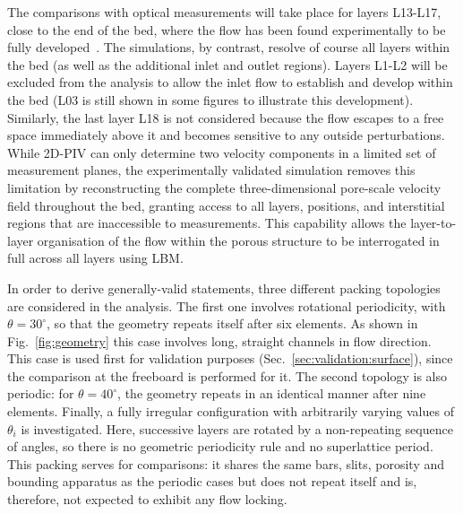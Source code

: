 The comparisons with optical measurements will take place for layers L13-L17, close to the end of the bed, where the flow has been found experimentally to be fully developed~\cite{velten2026}. The simulations, by contrast, resolve of course all layers within the bed (as well as the additional inlet and outlet regions). Layers L1-L2 will be excluded from the analysis to allow the inlet flow to establish and develop within the bed (L03 is still shown in some figures to illustrate this development). Similarly, the last layer L18 is not considered because the flow escapes to a free space immediately above it and becomes sensitive to any outside perturbations. While 2D-PIV can only determine two velocity components in a limited set of measurement planes, the experimentally validated simulation removes this limitation by reconstructing the complete three-dimensional pore-scale velocity field throughout the bed, granting access to all layers, positions, and interstitial regions that are inaccessible to measurements. This capability allows the layer-to-layer organisation of the flow within the porous structure to be interrogated in full across all layers using LBM.


In order to derive generally-valid statements, three different packing topologies are considered in the analysis. The first one involves rotational periodicity, with $\theta=30^\circ$, so that the geometry repeats itself after six elements. As shown in Fig.~\ref{fig:geometry} this case involves long, straight channels in flow direction. This case is used first for validation purposes (Sec.~\ref{sec:validation:surface}), since the comparison at the freeboard is performed for it.
The second topology is also periodic: for $\theta=40^\circ$, the geometry repeats in an identical manner after nine elements.
Finally, a fully irregular configuration with arbitrarily varying values of $\theta_i$ is investigated. Here, successive layers are rotated by a non-repeating sequence of angles, so there is no geometric periodicity rule and no superlattice period.  This packing serves for comparisons: it shares the same bars, slits, porosity and bounding apparatus as the periodic cases but does not repeat itself and is, therefore, not expected to exhibit any flow locking.



